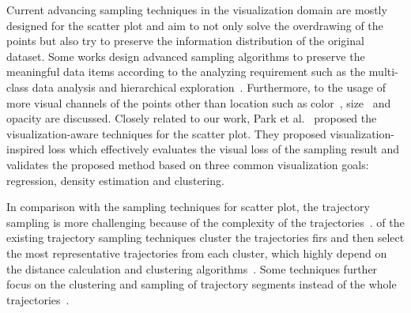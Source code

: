 Current advancing sampling techniques in the visualization domain are mostly designed for the scatter plot and aim to not only solve the overdrawing of the points but also try to preserve the information distribution of the original dataset. 
Some works design advanced sampling algorithms to preserve the meaningful data items according to the analyzing requirement such as the multi-class data analysis and hierarchical exploration~\cite{chen2014visual}. Furthermore, to the usage of more visual channels of the points other than location such as color~\cite{chen2014visual}, size~\cite{woodruff1998constant} and opacity are discussed. 
Closely related to our work, Park et al.~\cite{park2016visualization} proposed the visualization-aware techniques for the scatter plot. They proposed visualization-inspired loss which effectively evaluates the visual loss of the sampling result and validates the proposed method based on three common visualization goals:  regression, density estimation and clustering. 

In comparison with the sampling techniques for scatter plot, the trajectory sampling is more challenging because of the complexity of the trajectories~\cite{pelekis2010unsupervised}.  of the existing trajectory sampling techniques cluster the trajectories firs and then select the most representative trajectories from each cluster, which highly depend on the distance calculation and clustering algorithms~\cite{pelekis2007similarity}. Some techniques further focus on the clustering and sampling of trajectory segments instead of the whole trajectories~\cite{panagiotakis2011segmentation}. 

 


